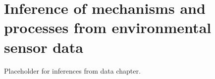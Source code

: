 \setchapterpreamble[u]{\margintoc}
\chapter{Inference of mechanisms and processes from environmental sensor data}

Placeholder for inferences from data chapter.

